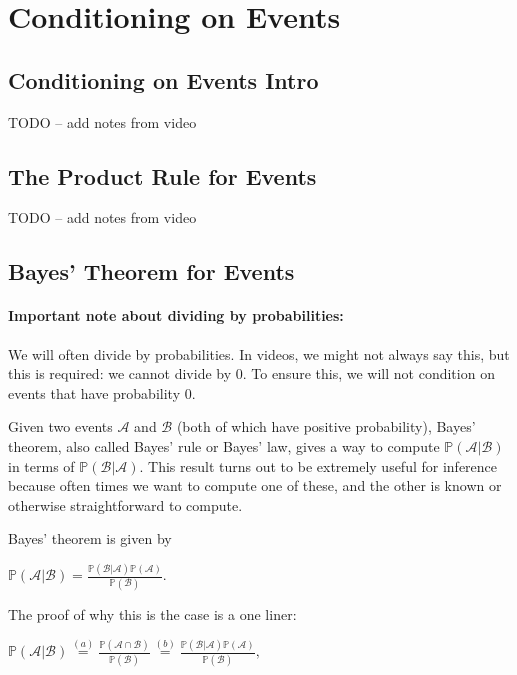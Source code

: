 \documentclass[6008notes.tex]{subfiles}
\begin{document}
\graphicspath{ {images/conditioning/} }

\section{Conditioning on Events}

\subsection{Conditioning on Events Intro}

TODO -- add notes from video

\subsection{The Product Rule for Events}

TODO -- add notes from video

\subsection{Bayes' Theorem for Events}

\paragraph{Important note about dividing by probabilities:} We will often divide by probabilities. In videos, we might not always say this, but this is required: we cannot divide by 0. To ensure this, we will not condition on events that have probability 0.

Given two events $\mathcal{A}$ and $\mathcal{B}$ (both of which have positive probability), Bayes' theorem, also called Bayes' rule or Bayes' law, gives a way to compute $\mathbb {P}(\mathcal{A} | \mathcal{B})$ in terms of $\mathbb {P}(\mathcal{B} | \mathcal{A})$. This result turns out to be extremely useful for inference because often times we want to compute one of these, and the other is known or otherwise straightforward to compute.

Bayes' theorem is given by

{\centering$\mathbb {P}(\mathcal{A} | \mathcal{B}) = \frac{\mathbb {P}(\mathcal{B} | \mathcal{A}) \mathbb {P}(\mathcal{A})}{\mathbb {P}(\mathcal{B})}.$ \par}
 
The proof of why this is the case is a one liner:

{\centering$\mathbb {P}(\mathcal{A} | \mathcal{B}) \overset {(a)}{=} \frac{\mathbb {P}(\mathcal{A} \cap \mathcal{B})}{\mathbb {P}(\mathcal{B})} \overset {(b)}{=} \frac{\mathbb {P}(\mathcal{B} | \mathcal{A}) \mathbb {P}(\mathcal{A})}{\mathbb {P}(\mathcal{B})},$ \par}
 
\end{document}
